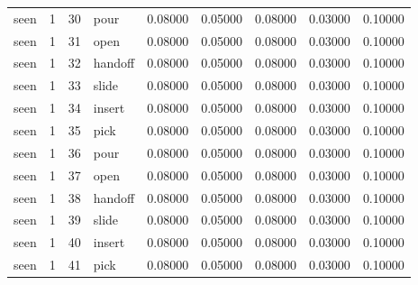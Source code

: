 \documentclass{article}
\begin{document}
\begin{center}
\begin{longtable}{lllllllll}
seen & 1 & 30 & pour & 0.08000 & 0.05000 & 0.08000 & 0.03000 & 0.10000 \\
seen & 1 & 31 & open & 0.08000 & 0.05000 & 0.08000 & 0.03000 & 0.10000 \\
seen & 1 & 32 & handoff & 0.08000 & 0.05000 & 0.08000 & 0.03000 & 0.10000 \\
seen & 1 & 33 & slide & 0.08000 & 0.05000 & 0.08000 & 0.03000 & 0.10000 \\
seen & 1 & 34 & insert & 0.08000 & 0.05000 & 0.08000 & 0.03000 & 0.10000 \\
seen & 1 & 35 & pick & 0.08000 & 0.05000 & 0.08000 & 0.03000 & 0.10000 \\
seen & 1 & 36 & pour & 0.08000 & 0.05000 & 0.08000 & 0.03000 & 0.10000 \\
seen & 1 & 37 & open & 0.08000 & 0.05000 & 0.08000 & 0.03000 & 0.10000 \\
seen & 1 & 38 & handoff & 0.08000 & 0.05000 & 0.08000 & 0.03000 & 0.10000 \\
seen & 1 & 39 & slide & 0.08000 & 0.05000 & 0.08000 & 0.03000 & 0.10000 \\
seen & 1 & 40 & insert & 0.08000 & 0.05000 & 0.08000 & 0.03000 & 0.10000 \\
seen & 1 & 41 & pick & 0.08000 & 0.05000 & 0.08000 & 0.03000 & 0.10000 \\
\bottomrule
\end{longtable}
\renewcommand{\arraystretch}{1.0}
\end{center}
\end{document}
